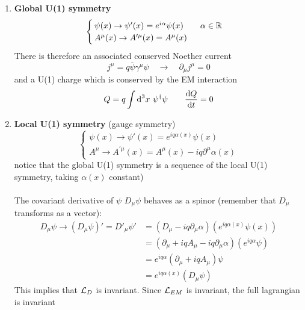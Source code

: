 \documentclass[TheoreticalPhy_ModB.tex]{subfiles}
\begin{document}
\begin{enumerate}[label=(\Roman*)]
\item \textbf{Global U(1) symmetry}
\[
\begin{cases}
\psi(x) \to \psi'(x) = e^{i \alpha}\psi(x) \qquad \alpha \in \mathbb{R} \\
A^{\mu}(x) \to A^{\prime \mu}(x) = A^{\mu}(x)
\end{cases}
\]
There is therefore an associated conserved Noether current
\[
j^{\mu} = q \overline{\psi} \gamma^{\mu} \psi
\quad \to \quad
\partial_{\mu}j^{\mu} = 0 
\]
and a U(1) charge which is conserved by the EM interaction
\[
Q = q \int \textup{d}^3 x \ \psi^{\dagger} \psi
\qquad
\frac{\textup{d} Q}{\textup{d} t} = 0
\]
\item \textbf{Local U(1) symmetry} (gauge symmetry)
\[
\begin{cases}
\psi(x) \to \psi'(x) = e^{iq\alpha(x)} \psi(x) \\
A^{\mu} \to A^{\prime \mu}(x) = A^{\mu}(x) - iq\partial^{\mu}\alpha(x)
\end{cases}
\]
notice that the global U(1) symmetry is a sequence of the local U(1) symmetry, taking $\alpha(x)$ constant)\\ \\
The covariant derivative of $\psi$ $D_{\mu}\psi$ behaves as a spinor (remember that $D_{\mu}$ transforms as a vector):
\[
\begin{split}
D_{\mu}\psi \to (D_{\mu}\psi)' = D'_{\mu}\psi'	& = (D_{\mu} - iq\partial_{\mu} \alpha)(e^{iq\alpha(x)} \psi(x)) \\
	& = (\partial_{\mu} + iqA_{\mu} - iq\partial_{\mu}\alpha)(e^{iq\alpha} \psi) \\
	& = e^{iq\alpha}(\partial_{\mu} + iqA_{\mu})\psi \\
	& = e^{iq\alpha(x)}(D_{\mu}\psi)
\end{split}
\]
This implies that $\mathcal{L}_D$ is invariant. Since $\mathcal{L}_{EM}$ is invariant, the full lagrangian is invariant
\end{enumerate}
\end{document}
